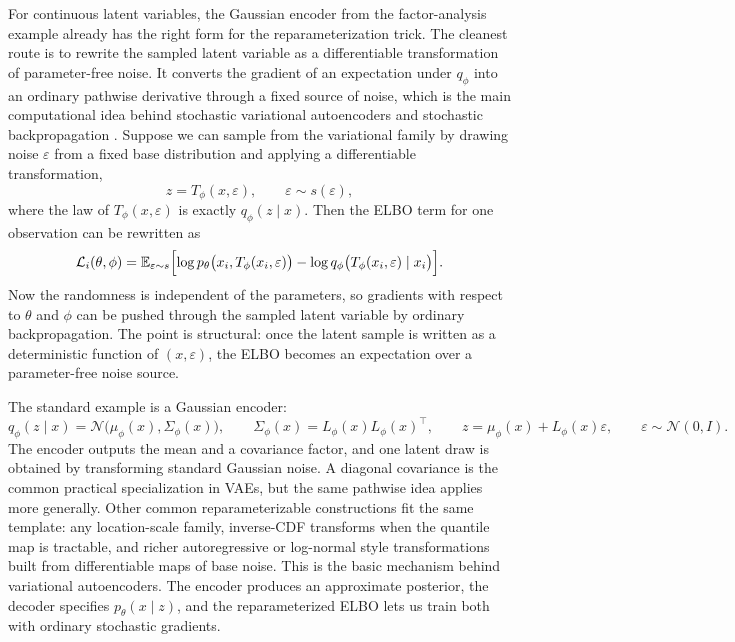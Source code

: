 For continuous latent variables, the Gaussian encoder from the factor-analysis example already has the right form for the reparameterization trick.
The cleanest route is to rewrite the sampled latent variable as a differentiable transformation of parameter-free noise.
It converts the gradient of an expectation under \(q_\phi\) into an ordinary pathwise derivative through a fixed source of noise, which is the main computational idea behind stochastic variational autoencoders \citep[\S2.3]{kingma_welling_2014_aevb} and stochastic backpropagation \citep[\S3]{rezende_mohamed_wierstra_2014_stochastic_backpropagation}.
Suppose we can sample from the variational family by drawing noise $\varepsilon$ from a fixed base distribution and applying a differentiable transformation,
\begin{equation}
  z = T_\phi(x,\varepsilon),
  \qquad
  \varepsilon \sim s(\varepsilon),
  \label{eq:reparameterization-map}
\end{equation}
where the law of $T_\phi(x,\varepsilon)$ is exactly $q_\phi(z\mid x)$.
Then the ELBO term for one observation can be rewritten as
\begin{equation}
  \mathcal{L}_i(\theta,\phi)
  =
  \mathbb{E}_{\varepsilon\sim s}
  \Bigl[
    \log p_\theta\bigl(x_i,T_\phi(x_i,\varepsilon)\bigr)
    -
    \log q_\phi\bigl(T_\phi(x_i,\varepsilon)\mid x_i\bigr)
  \Bigr].
  \label{eq:reparameterized-elbo}
\end{equation}
Now the randomness is independent of the parameters, so gradients with respect to $\theta$ and $\phi$ can be pushed through the sampled latent variable by ordinary backpropagation.
The point is structural: once the latent sample is written as a deterministic function of \((x,\varepsilon)\), the ELBO becomes an expectation over a parameter-free noise source.

The standard example is a Gaussian encoder:
\begin{equation}
  q_\phi(z\mid x)
  =
  \mathcal{N}\!\bigl(\mu_\phi(x),\Sigma_\phi(x)\bigr),
  \qquad
  \Sigma_\phi(x)
  =
  L_\phi(x)L_\phi(x)^\top,
  \qquad
  z
  =
  \mu_\phi(x) + L_\phi(x)\varepsilon,
  \qquad
  \varepsilon\sim\mathcal{N}(0,I).
  \label{eq:gaussian-reparameterization}
\end{equation}
The encoder outputs the mean and a covariance factor, and one latent draw is obtained by transforming standard Gaussian noise.
A diagonal covariance is the common practical specialization in VAEs, but the same pathwise idea applies more generally.
Other common reparameterizable constructions fit the same template: any location-scale family, inverse-CDF transforms when the quantile map is tractable, and richer autoregressive or log-normal style transformations built from differentiable maps of base noise.
This is the basic mechanism behind variational autoencoders.
The encoder produces an approximate posterior, the decoder specifies $p_\theta(x\mid z)$, and the reparameterized ELBO lets us train both with ordinary stochastic gradients.

